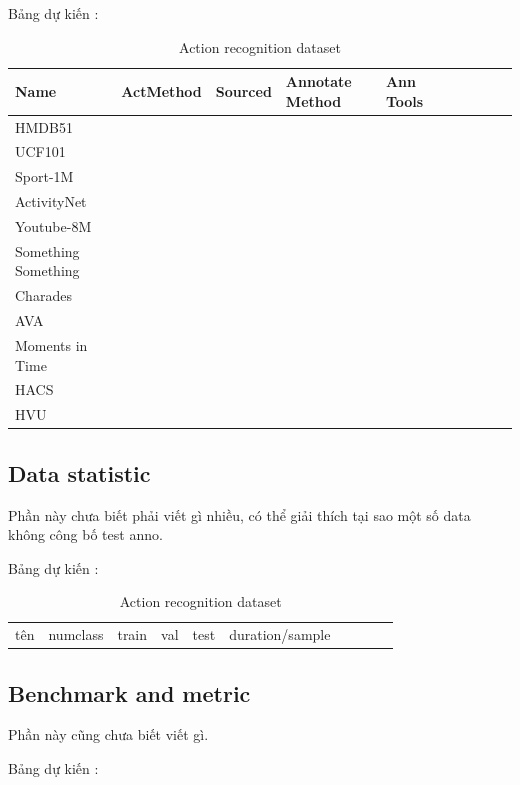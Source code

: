 \documentclass[a4paper]{article}
\begin{document}
Bảng dự kiến : 

\begin{table}[h]
	\centering
	\caption{Action recognition dataset}
	\renewcommand{\arraystretch}{1.5}
	\begin{tabular}{l|l l l l l l l l l}
		\toprule
		Name & ActMethod & Sourced & Annotate Method & Ann Tools \\
		\hline
		HMDB51               &  \\
		UCF101               &  \\
		Sport-1M             &  \\
		ActivityNet          &  \\ 
		Youtube-8M           &  \\
		Something Something  &  \\
		Charades             &  \\
		AVA                  &  \\
		Moments in Time      &  \\
		HACS                 &  \\
		HVU                  &  \\
	\end{tabular}%
	\label{config6}
\end{table}%

\subsection{Data statistic}

Phần này chưa biết phải viết gì nhiều, có thể giải thích tại sao một số data không công bố test anno.

Bảng dự kiến : 

\begin{table}[h]
	\centering
	\caption{Action recognition dataset}
	\begin{tabular}{l|l l l l l l l l l}
		\toprule
		tên & numclass & train & val & test & duration/sample \\
	\end{tabular}%
	\label{config2}
\end{table}%

\subsection{Benchmark and metric}

Phần này cũng chưa biết viết gì.

Bảng dự kiến : 
\end{document}
